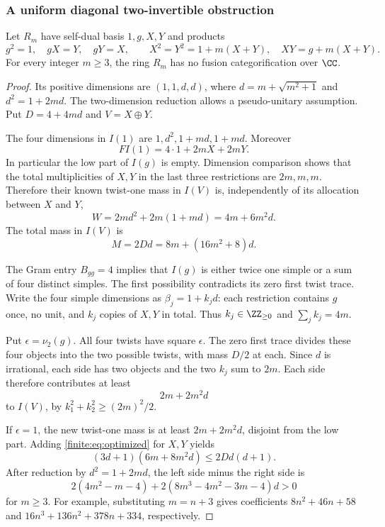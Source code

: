 \subsubsection{A uniform diagonal two-invertible obstruction}
\begin{theorem}\label{finite:thm:diagonal}
Let $R_m$ have self-dual basis $1,g,X,Y$ and products
\[
g^2=1,\quad gX=Y,\quad gY=X,\qquad
X^2=Y^2=1+m(X+Y),\quad XY=g+m(X+Y).
\]
For every integer $m\geq3$, the ring $R_m$ has no fusion categorification over $\CC$.
\end{theorem}
\begin{proof}
Its positive dimensions are $(1,1,d,d)$, where $d=m+\sqrt{m^2+1}$ and $d^2=1+2md$. The two-dimension reduction allows a pseudo-unitary assumption. Put $D=4+4md$ and $V=X\oplus Y$.

The four dimensions in $I(1)$ are $1,d^2,1+md,1+md$. Moreover
\[
FI(1)=4\cdot1+2mX+2mY.
\]
In particular the low part of $I(g)$ is empty. Dimension comparison shows that the total multiplicities of $X,Y$ in the last three restrictions are $2m,m,m$. Therefore their known twist-one mass in $I(V)$ is, independently of its allocation between $X$ and $Y$,
\begin{equation}\label{finite:eq:diag-W}
W=2md^2+2m(1+md)=4m+6m^2d.
\end{equation}
The total mass in $I(V)$ is
\[
M=2Dd=8m+(16m^2+8)d.
\]

The Gram entry $B_{gg}=4$ implies that $I(g)$ is either twice one simple or a sum of four distinct simples. The first possibility contradicts its zero first twist trace. Write the four simple dimensions as $\beta_j=1+k_jd$: each restriction contains $g$ once, no unit, and $k_j$ copies of $X,Y$ in total. Thus $k_j\in\ZZ_{\geq0}$ and $\sum_jk_j=4m$.

Put $\epsilon=\nu_2(g)$. All four twists have square $\epsilon$. The zero first trace divides these four objects into the two possible twists, with mass $D/2$ at each. Since $d$ is irrational, each side has two objects and the two $k_j$ sum to $2m$. Each side therefore contributes at least
\[
2m+2m^2d
\]
to $I(V)$, by $k_1^2+k_2^2\geq(2m)^2/2$.

If $\epsilon=1$, the new twist-one mass is at least $2m+2m^2d$, disjoint from the low part. Adding \eqref{finite:eq:optimized} for $X,Y$ yields
\[
(3d+1)(6m+8m^2d)\leq 2Dd(d+1).
\]
After reduction by $d^2=1+2md$, the left side minus the right side is
\[
2(4m^2-m-4)+2(8m^3-4m^2-3m-4)d>0
\]
for $m\geq3$. For example, substituting $m=n+3$ gives coefficients
$8n^2+46n+58$ and $16n^3+136n^2+378n+334$, respectively.


\end{proof}
